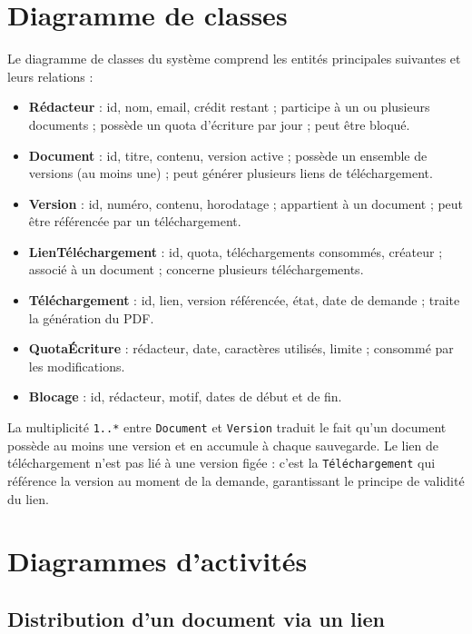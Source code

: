 \section{Diagramme de classes}

Le diagramme de classes du système comprend les entités principales suivantes et leurs relations :

\begin{itemize}
    \item \textbf{Rédacteur} : id, nom, email, crédit restant ; participe à un ou plusieurs documents ; possède un quota d'écriture par jour ; peut être bloqué.
    \item \textbf{Document} : id, titre, contenu, version active ; possède un ensemble de versions (au moins une) ; peut générer plusieurs liens de téléchargement.
    \item \textbf{Version} : id, numéro, contenu, horodatage ; appartient à un document ; peut être référencée par un téléchargement.
    \item \textbf{LienTéléchargement} : id, quota, téléchargements consommés, créateur ; associé à un document ; concerne plusieurs téléchargements.
    \item \textbf{Téléchargement} : id, lien, version référencée, état, date de demande ; traite la génération du PDF.
    \item \textbf{QuotaÉcriture} : rédacteur, date, caractères utilisés, limite ; consommé par les modifications.
    \item \textbf{Blocage} : id, rédacteur, motif, dates de début et de fin.
\end{itemize}

\begin{infobox}
La multiplicité \texttt{1..*} entre \texttt{Document} et \texttt{Version} traduit le fait qu'un document possède au moins une version et en accumule à chaque sauvegarde. Le lien de téléchargement n'est pas lié à une version figée : c'est la \texttt{Téléchargement} qui référence la version au moment de la demande, garantissant le principe de validité du lien.
\end{infobox}

\section{Diagrammes d'activités}

\subsection{Distribution d'un document via un lien}

